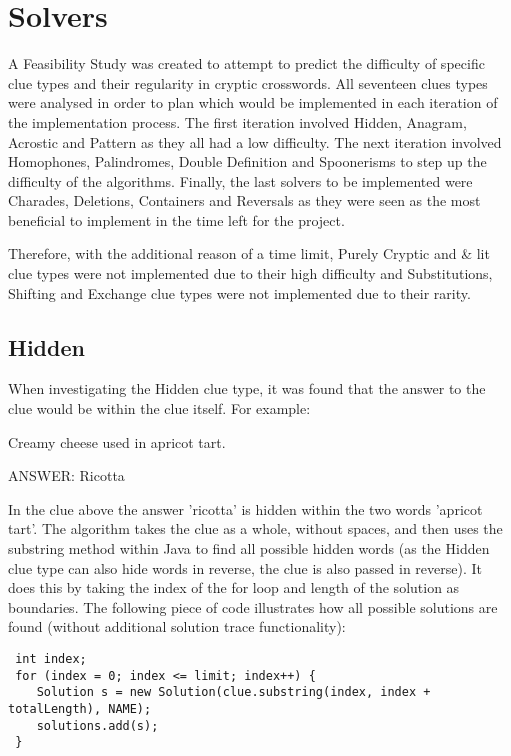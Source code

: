 \section{Solvers}
\label{sec:solvers}

A Feasibility Study was created to attempt to predict the difficulty of specific
 clue types and their regularity in cryptic crosswords. All seventeen clues
 types were analysed in order to plan which would be implemented in each
 iteration of the implementation process. The first iteration involved Hidden,
 Anagram, Acrostic and Pattern as they all had a low difficulty. The next iteration
 involved Homophones, Palindromes, Double Definition and Spoonerisms to step
 up the difficulty of the algorithms. Finally, the last solvers to be implemented were
 Charades, Deletions, Containers and Reversals as they were seen as the most
 beneficial to implement in the time left for the project. 

Therefore, with the additional reason of a time limit,  Purely Cryptic and
 \& lit clue types were not implemented due to their high difficulty and Substitutions,
 Shifting and Exchange clue types were not implemented due to their rarity.

\subsection{Hidden}

When investigating the Hidden clue type, it was found that the answer to the clue 
would be within the clue itself. For example:

Creamy cheese used in apricot tart.

 
ANSWER: Ricotta

In the clue above the answer 'ricotta' is hidden within the two words 'apricot tart'.
The algorithm takes the clue as a whole, without spaces, and then uses the substring method 
within Java to find all possible hidden words (as the Hidden clue type can also hide words
 in reverse, the clue is also passed in reverse). It does this by taking the index of
 the for loop and length of the solution as boundaries. The following piece of code 
illustrates how all possible solutions are found (without additional solution trace
functionality):

\begin{lstlisting}
 int index;
 for (index = 0; index <= limit; index++) {
	Solution s = new Solution(clue.substring(index, index + totalLength), NAME);
	solutions.add(s);
 }
\end{lstlisting}


